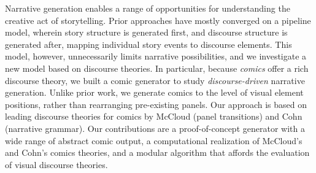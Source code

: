 Narrative generation enables a range of opportunities for understanding 
the creative act of storytelling.
Prior approaches have mostly converged on a pipeline model, wherein
story structure is generated first, and discourse structure is
generated after, mapping individual story events to discourse elements. 
This model, however, unnecessarily limits narrative possibilities, and 
we investigate a new model based on discourse theories. In particular, 
because \emph{comics} offer a rich discourse theory, we built a
comic generator to study \emph{discourse-driven} narrative generation.  
Unlike prior work, we generate comics to the level of visual element
positions, rather than rearranging pre-existing panels.  
Our approach is based on leading discourse theories for comics by McCloud
(panel transitions) and Cohn (narrative grammar).
Our contributions are a proof-of-concept generator with a wide range of
abstract comic output, a computational realization of McCloud's and Cohn's
comics theories, and a modular algorithm that affords the evaluation of 
visual discourse theories.


